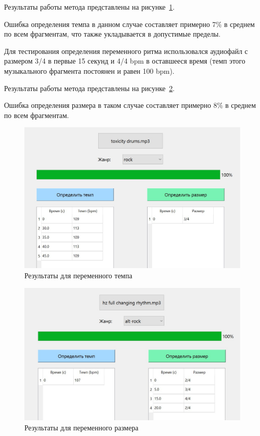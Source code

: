 Результаты работы метода представлены на рисунке~\ref{img:test_tempo}.

Ошибка определения темпа в данном случае составляет примерно 7\% в среднем по всем фрагментам, что также укладывается в допустимые пределы.

Для тестирования определения переменного ритма использовался аудиофайл с размером 3/4 в первые 15 секунд и 4/4 bpm в оставшееся время (темп этого музыкального фрагмента постоянен и равен 100 bpm).

Результаты работы метода представлены на рисунке~\ref{img:test_rhythm}.

Ошибка определения размера в таком случае составляет примерно 8\% в среднем по всем фрагментам.

\begin{figure}[h]
	\centering
	\includegraphics[scale=0.85]{inc/img/test_tempo.jpg}
	\caption{Результаты для переменного темпа}
	\label{img:test_tempo}
\end{figure}

\begin{figure}[h]
	\centering
	\includegraphics[scale=0.85]{inc/img/test_rhythm.jpg}
	\caption{Результаты для переменного размера}
	\label{img:test_rhythm}
\end{figure}

